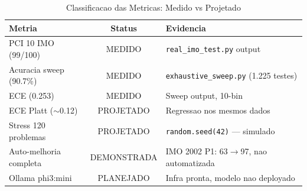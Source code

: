 \documentclass[5p]{elsarticle}
\newcommand{\tabfootnotesize}{\fontsize{9}{11}\selectfont}
\begin{document}
\begin{table}[H]
\centering
\caption{Classificacao das Metricas: Medido vs Projetado}
\label{tab:medido}
\tabfootnotesize
\begin{tabular}{l c l}
\toprule
\textbf{Metria} & \textbf{Status} & \textbf{Evidencia}\\
\midrule
PCI 10 IMO (99/100) & MEDIDO & \texttt{real\_imo\_test.py} output\\
Acuracia sweep (90.7\%) & MEDIDO & \texttt{exhaustive\_sweep.py} (1.225 testes)\\
ECE (0.253) & MEDIDO & Sweep output, 10-bin\\
ECE Platt ($\sim$0.12) & PROJETADO & Regressao nos mesmos dados\\
Stress 120 problemas & PROJETADO & \texttt{random.seed(42)} --- simulado\\
Auto-melhoria completa & DEMONSTRADA & IMO 2002 P1: 63$\to$97, nao automatizada\\
Ollama phi3:mini & PLANEJADO & Infra pronta, modelo nao deployado\\
\bottomrule
\end{tabular}
\end{table}
\end{document}
